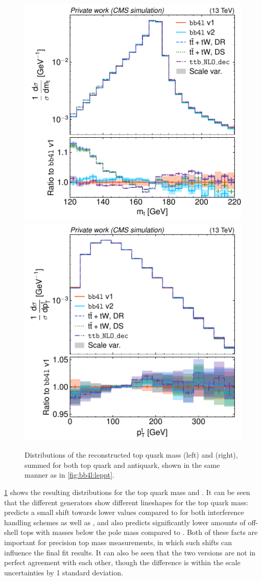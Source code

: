 \begin{figure}[tp]
    \centering
    \includegraphics[width=0.49 \textwidth]{figures/bb4l/generators/MC_TTBAR_DILEP_SPINDENSITY_anytop_mass.pdf}
    \hfill
    \includegraphics[width=0.49 \textwidth]{figures/bb4l/generators/MC_TTBAR_DILEP_SPINDENSITY_anytop_pt.pdf}
    \caption{Distributions of the reconstructed top quark mass (left) and \pt (right), summed for both top quark and antiquark, shown in the same manner as in \cref{fig:bb4l:leppt}.}
    \label{fig:bb4l:top}
\end{figure}

\cref{fig:bb4l:top} shows the resulting distributions for the top quark mass and \pt. It can be seen that the different generators show different lineshapes for the top quark mass: \bbfourl predicts a small shift towards lower values compared to \tttWsum for both interference handling schemes as well as \ttb, and also predicts significantly lower amounts of off-shell tops with masses below the pole mass compared to \tttWsum. Both of these facts are important for precision top mass measurements, in which such shifts can influence the final fit results. It can also be seen that the two \bbfourl versions are not in perfect agreement with each other, though the difference is within the scale uncertainties by 1 standard deviation.

